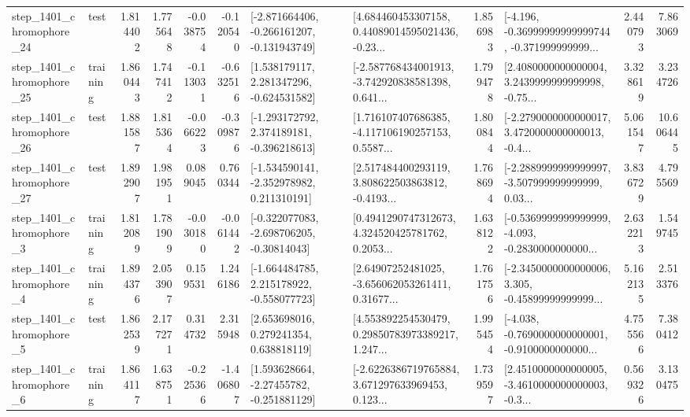 \begin{tabular}{llrrrrllrlrr}
 step\_1401\_chromophore\_24 &      test &      1.814402 &    1.775648 &     -0.038754 & -0.120540 &  [-2.871664406, -0.266161207, -0.131943749] &  [4.684460453307158, 0.44089014595021436, -0.23... &       1.856983 &  [-4.196, -0.36999999999999744, -0.371999999999... &            2.440793 &          7.863069 \\
 step\_1401\_chromophore\_25 &  training &      1.860443 &    1.747412 &     -0.113031 & -0.632516 &    [1.538179117, 2.281347296, -0.624531582] &  [-2.587768434001913, -3.742920838581398, 0.641... &       1.799478 &  [2.4080000000000004, 3.2439999999999998, -0.75... &            3.328619 &          3.234726 \\
 step\_1401\_chromophore\_26 &      test &      1.881587 &    1.815364 &     -0.066223 & -0.309876 &   [-1.293172792, 2.374189181, -0.396218613] &  [1.716107407686385, -4.117106190257153, 0.5587... &       1.800844 &  [-2.2790000000000017, 3.4720000000000013, -0.4... &            5.061547 &         10.606445 \\
 step\_1401\_chromophore\_27 &      test &      1.892907 &    1.981951 &      0.089045 &  0.760344 &   [-1.534590141, -2.352978982, 0.211310191] &  [2.517484400293119, 3.808622503863812, -0.4193... &       1.768694 &  [-2.2889999999999997, -3.507999999999999, 0.03... &            3.836729 &          4.795569 \\
  step\_1401\_chromophore\_3 &  training &      1.812089 &    1.781909 &     -0.030180 & -0.061442 &   [-0.322077083, -2.698706205, -0.30814043] &  [0.4941290747312673, 4.324520425781762, 0.2053... &       1.638122 &  [-0.5369999999999999, -4.093, -0.2830000000000... &            2.632213 &          1.549745 \\
  step\_1401\_chromophore\_4 &  training &      1.894376 &    2.053907 &      0.159531 &  1.246186 &   [-1.664484785, 2.215178922, -0.558077723] &  [2.64907252481025, -3.656062053261411, 0.31677... &       1.761756 &  [-2.3450000000000006, 3.305, -0.45899999999999... &            5.162135 &          2.513376 \\
  step\_1401\_chromophore\_5 &      test &      1.862539 &    2.177271 &      0.314732 &  2.315948 &     [2.653698016, 0.279241354, 0.638818119] &  [4.553892254530479, 0.29850783973389217, 1.247... &       1.995454 &  [-4.038, -0.7690000000000001, -0.9100000000000... &            4.755566 &          7.380412 \\
  step\_1401\_chromophore\_6 &  training &      1.864117 &    1.638751 &     -0.225366 & -1.406807 &    [1.593628664, -2.27455782, -0.251881129] &  [-2.6226386719765884, 3.671297633969453, 0.123... &       1.739597 &  [2.4510000000000005, -3.4610000000000003, -0.3... &            0.569326 &          3.130475 \\

\end{tabular}
